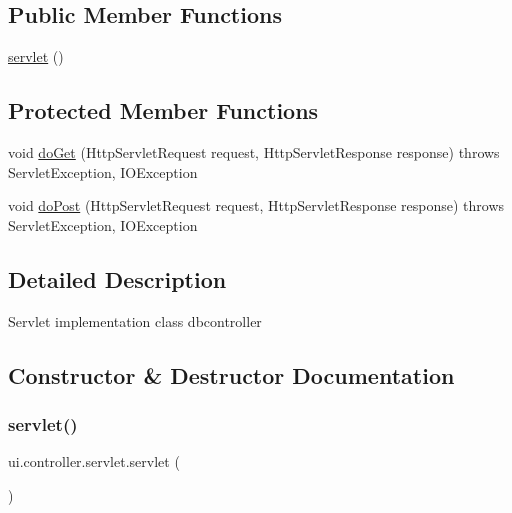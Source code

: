 \subsection*{Public Member Functions}
\begin{DoxyCompactItemize}
\item 
\mbox{\hyperlink{classui_1_1controller_1_1servlet_a7d29e94105a83dfc5dc1f104058f7de0}{servlet}} ()
\end{DoxyCompactItemize}
\subsection*{Protected Member Functions}
\begin{DoxyCompactItemize}
\item 
void \mbox{\hyperlink{classui_1_1controller_1_1servlet_a547878c9dee95f1b799d074ac6316f4b}{do\+Get}} (Http\+Servlet\+Request request, Http\+Servlet\+Response response)  throws Servlet\+Exception, I\+O\+Exception 	
\item 
void \mbox{\hyperlink{classui_1_1controller_1_1servlet_a02867e7637116d244a8233f99c40038a}{do\+Post}} (Http\+Servlet\+Request request, Http\+Servlet\+Response response)  throws Servlet\+Exception, I\+O\+Exception 	
\end{DoxyCompactItemize}


\subsection{Detailed Description}
Servlet implementation class dbcontroller 

\subsection{Constructor \& Destructor Documentation}
\mbox{\label{classui_1_1controller_1_1servlet_a7d29e94105a83dfc5dc1f104058f7de0}} 
\subsubsection{\texorpdfstring{servlet()}{servlet()}}
{\footnotesize\ttfamily ui.\+controller.\+servlet.\+servlet (\begin{DoxyParamCaption}{ }\end{DoxyParamCaption})\hspace{0.3cm}{\ttfamily [inline]}}


